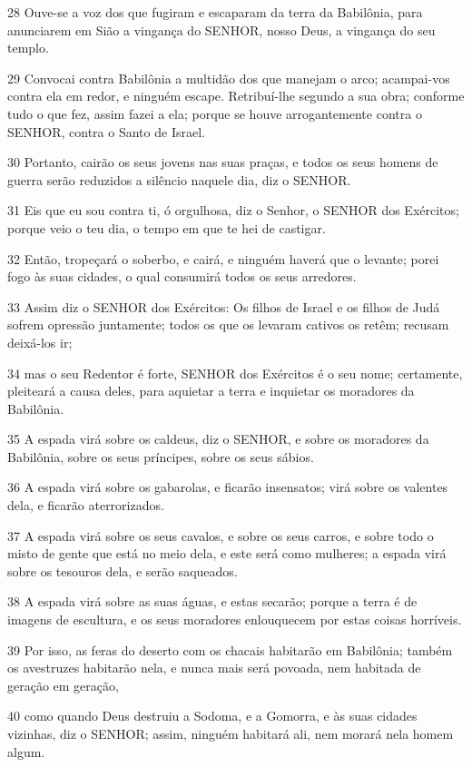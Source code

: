 \par 28 Ouve-se a voz dos que fugiram e escaparam da terra da Babilônia, para anunciarem em Sião a vingança do SENHOR, nosso Deus, a vingança do seu templo.
\par 29 Convocai contra Babilônia a multidão dos que manejam o arco; acampai-vos contra ela em redor, e ninguém escape. Retribuí-lhe segundo a sua obra; conforme tudo o que fez, assim fazei a ela; porque se houve arrogantemente contra o SENHOR, contra o Santo de Israel.
\par 30 Portanto, cairão os seus jovens nas suas praças, e todos os seus homens de guerra serão reduzidos a silêncio naquele dia, diz o SENHOR.
\par 31 Eis que eu sou contra ti, ó orgulhosa, diz o Senhor, o SENHOR dos Exércitos; porque veio o teu dia, o tempo em que te hei de castigar.
\par 32 Então, tropeçará o soberbo, e cairá, e ninguém haverá que o levante; porei fogo às suas cidades, o qual consumirá todos os seus arredores.
\par 33 Assim diz o SENHOR dos Exércitos: Os filhos de Israel e os filhos de Judá sofrem opressão juntamente; todos os que os levaram cativos os retêm; recusam deixá-los ir;
\par 34 mas o seu Redentor é forte, SENHOR dos Exércitos é o seu nome; certamente, pleiteará a causa deles, para aquietar a terra e inquietar os moradores da Babilônia.
\par 35 A espada virá sobre os caldeus, diz o SENHOR, e sobre os moradores da Babilônia, sobre os seus príncipes, sobre os seus sábios.
\par 36 A espada virá sobre os gabarolas, e ficarão insensatos; virá sobre os valentes dela, e ficarão aterrorizados.
\par 37 A espada virá sobre os seus cavalos, e sobre os seus carros, e sobre todo o misto de gente que está no meio dela, e este será como mulheres; a espada virá sobre os tesouros dela, e serão saqueados.
\par 38 A espada virá sobre as suas águas, e estas secarão; porque a terra é de imagens de escultura, e os seus moradores enlouquecem por estas coisas horríveis.
\par 39 Por isso, as feras do deserto com os chacais habitarão em Babilônia; também os avestruzes habitarão nela, e nunca mais será povoada, nem habitada de geração em geração,
\par 40 como quando Deus destruiu a Sodoma, e a Gomorra, e às suas cidades vizinhas, diz o SENHOR; assim, ninguém habitará ali, nem morará nela homem algum.
